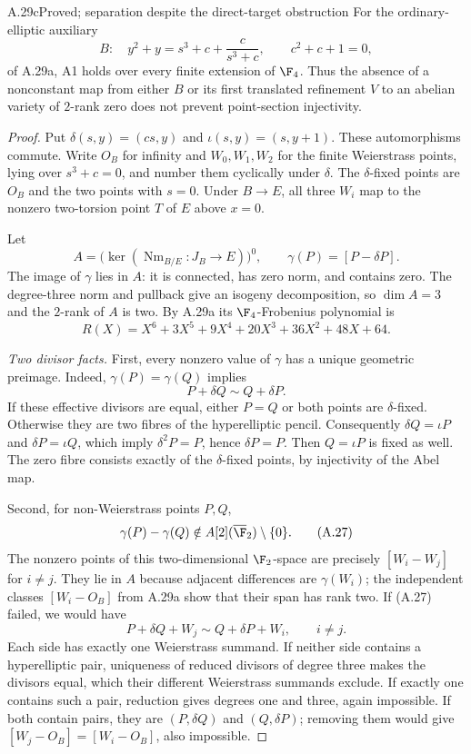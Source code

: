 \begin{claim}{A.29c}{Proved; separation despite the direct-target obstruction}
For the ordinary-elliptic auxiliary
\[
 B:\quad y^2+y=s^3+c+\frac{c}{s^3+c},\qquad c^2+c+1=0,
\]
of A.29a, A1 holds over every finite extension of $\F_4$.
Thus the absence of a nonconstant map from either $B$ or its
first translated refinement $V$ to an abelian variety of
$2$-rank zero does not prevent point-section injectivity.
\end{claim}
\begin{proof}
Put $\delta(s,y)=(cs,y)$ and $\iota(s,y)=(s,y+1)$.
These automorphisms commute. Write $O_B$ for infinity and
$W_0,W_1,W_2$ for the finite Weierstrass points, lying over
$s^3+c=0$, and number them cyclically under $\delta$.
The $\delta$-fixed points are $O_B$ and the two points with
$s=0$. Under $B\to E$, all three $W_i$ map to the nonzero
two-torsion point $T$ of $E$ above $x=0$.

Let
\[
 A=\bigl(\ker(\operatorname{Nm}_{B/E}:J_B\to E)\bigr)^0,
 \qquad \gamma(P)=[P-\delta P].
\]
The image of $\gamma$ lies in $A$: it is connected, has
zero norm, and contains zero. The degree-three norm and
pullback give an isogeny decomposition, so
$\dim A=3$ and the $2$-rank of $A$ is two. By A.29a its
$\F_4$-Frobenius polynomial is
\[
 R(X)=X^6+3X^5+9X^4+20X^3+36X^2+48X+64.                \tag{A.26}
\]

\emph{Two divisor facts.}
First, every nonzero value of $\gamma$ has a unique
geometric preimage. Indeed, $\gamma(P)=\gamma(Q)$ implies
\[
 P+\delta Q\sim Q+\delta P.
\]
If these effective divisors are equal, either $P=Q$ or
both points are $\delta$-fixed. Otherwise they are two
fibres of the hyperelliptic pencil. Consequently
$\delta Q=\iota P$ and $\delta P=\iota Q$, which imply
$\delta^2P=P$, hence $\delta P=P$. Then $Q=\iota P$
is fixed as well. The zero fibre consists exactly of the
$\delta$-fixed points, by injectivity of the Abel map.

Second, for non-Weierstrass points $P,Q$,
\[
 \gamma(P)-\gamma(Q)\notin A[2](\overline{\F}_2)
                                      \setminus\{0\}.    \tag{A.27}
\]
The nonzero points of this two-dimensional $\F_2$-space
are precisely $[W_i-W_j]$ for $i\ne j$. They lie in $A$
because adjacent differences are $\gamma(W_i)$; the
independent classes $[W_i-O_B]$ from A.29a show that
their span has rank two. If (A.27) failed, we would have
\[
 P+\delta Q+W_j\sim Q+\delta P+W_i,\qquad i\ne j.        \tag{A.28}
\]
Each side has exactly one Weierstrass summand. If neither
side contains a hyperelliptic pair, uniqueness of reduced
divisors of degree three makes the divisors equal, which
their different Weierstrass summands exclude. If exactly
one contains such a pair, reduction gives degrees one and
three, again impossible. If both contain pairs, they are
$(P,\delta Q)$ and $(Q,\delta P)$; removing them would
give $[W_j-O_B]=[W_i-O_B]$, also impossible.


\end{proof}
